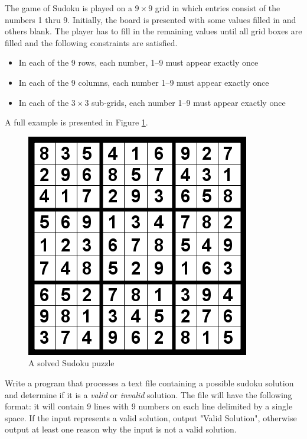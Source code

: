 \begin{exer}
The game of Sudoku is played on a $9 \times 9$ grid in which
entries consist of the numbers 1 thru 9.  Initially, the board is 
presented with some values filled in and others blank.  The player 
has to fill in the remaining values until all grid boxes are filled and
the following constraints are satisfied.
\begin{itemize}
  \item In each of the 9 rows, each number, 1--9 must appear exactly once
  \item In each of the 9 columns, each number 1--9 must appear exactly once
  \item In each of the $3 \times 3$ sub-grids, each number 1--9 must appear exactly once
\end{itemize}
A full example is presented in Figure \ref{fig:sudoku01}.
\begin{figure}[h]
\centering
\includegraphics[scale=0.50]{images/sudoku01.png}
\caption{A solved Sudoku puzzle}
\label{fig:sudoku01}
\end{figure}

Write a program that processes a text file containing a possible 
sudoku solution and determine if it is a \emph{valid} or \emph{invalid} 
solution.  The file will have the following format: it will contain 9 lines 
with 9 numbers on each line delimited by a single space.  If the input 
represents a valid solution, output "Valid Solution", otherwise output at 
least one reason why the input is not a valid solution.
\end{exer}

